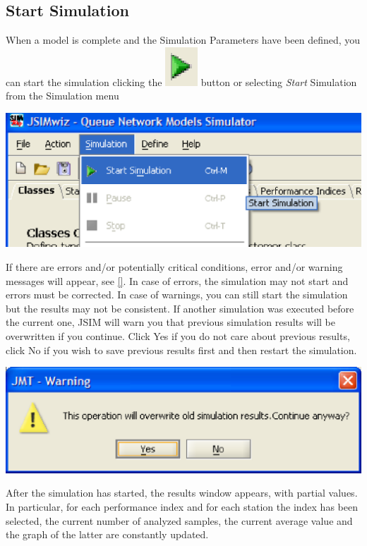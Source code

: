 \begin{description*}
\section{Start Simulation}
\label{sec:StartSimulation}
When a model is complete and the Simulation Parameters have been defined, you can start the simulation clicking the \includegraphics[scale=.5]{img/jsim/start2.eps} button or selecting \emph{Start} Simulation from the Simulation menu
\begin{center}
\includegraphics[scale=.5]{img/jsim/start1.eps}
\end{center}
If there are errors and/or potentially critical conditions, error and/or warning messages will appear, see \autoref{}. In case of errors, the simulation may not start
and errors must be corrected. In case of warnings, you can still start the simulation but the results may not be consistent.
If another simulation was executed before the current one, JSIM will warn you that previous simulation results will be overwritten if you continue. Click Yes if you do not care about previous results, click No if you wish to save previous results first and then restart the simulation.
\begin{center}
\includegraphics[scale=.5]{img/jsim/confirm.eps}
\end{center}
After the simulation has started, the results window appears, with partial values. In particular, for each performance index and for each station the index has been selected, the current number of analyzed samples, the current average value and the graph of the latter are constantly updated.

\end{description*}
